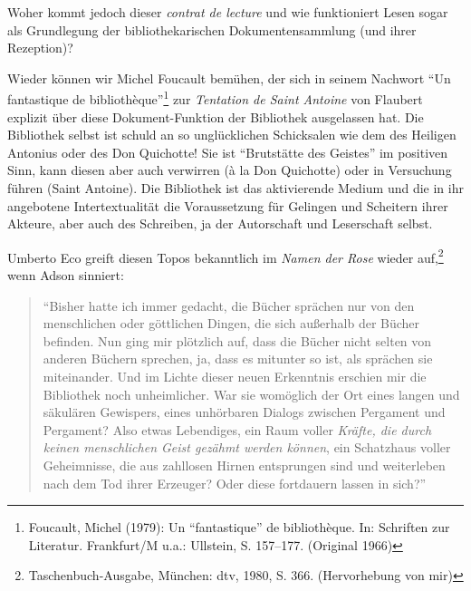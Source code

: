 Woher kommt jedoch dieser \emph{contrat de lecture} und wie funktioniert
Lesen sogar als Grundlegung der bibliothekarischen Dokumentensammlung
(und ihrer Rezeption)?

Wieder können wir Michel Foucault bemühen, der sich in seinem Nachwort
\enquote{Un fantastique de bibliothèque}\footnote{Foucault, Michel
  (1979): Un \enquote{fantastique} de bibliothèque. In: Schriften zur
  Literatur. Frankfurt/M u.a.: Ullstein, S. 157--177. (Original 1966)}
zur \emph{Tentation de Saint Antoine} von Flaubert explizit über diese
Dokument-Funktion der Bibliothek ausgelassen hat. Die Bibliothek selbst
ist schuld an so unglücklichen Schicksalen wie dem des Heiligen Antonius
oder des Don Quichotte! Sie ist \enquote{Brutstätte des Geistes} im
positiven Sinn, kann diesen aber auch verwirren (à la Don Quichotte)
oder in Versuchung führen (Saint Antoine). Die Bibliothek ist das
aktivierende Medium und die in ihr angebotene Intertextualität die
Voraussetzung für Gelingen und Scheitern ihrer Akteure, aber auch des
Schreiben, ja der Autorschaft und Leserschaft selbst.

Umberto Eco greift diesen Topos bekanntlich im \emph{Namen der Rose}
wieder auf,\footnote{Taschenbuch-Ausgabe, München: dtv, 1980, S. 366.
  (Hervorhebung von mir)} wenn Adson sinniert:

\begin{quote}
\enquote{Bisher hatte ich immer gedacht, die Bücher sprächen nur von den
menschlichen oder göttlichen Dingen, die sich außerhalb der Bücher
befinden. Nun ging mir plötzlich auf, dass die Bücher nicht selten von
anderen Büchern sprechen, ja, dass es mitunter so ist, als sprächen sie
miteinander. Und im Lichte dieser neuen Erkenntnis erschien mir die
Bibliothek noch unheimlicher. War sie womöglich der Ort eines langen und
säkulären Gewispers, eines unhörbaren Dialogs zwischen Pergament und
Pergament? Also etwas Lebendiges, ein Raum voller \emph{Kräfte, die
durch keinen menschlichen Geist gezähmt werden können}, ein Schatzhaus
voller Geheimnisse, die aus zahllosen Hirnen entsprungen sind und
weiterleben nach dem Tod ihrer Erzeuger? Oder diese fortdauern lassen in
sich?}
\end{quote}

